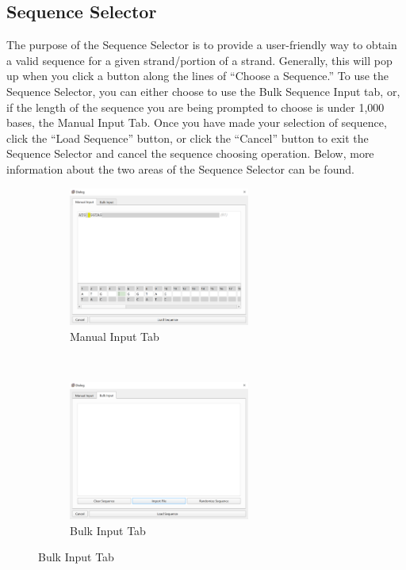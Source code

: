 \documentclass[titlepage]{article}
\begin{document}
\subsection{Sequence Selector} \label{sect:sequence-selector}
	The purpose of the Sequence Selector is to provide a user-friendly way to obtain a valid sequence for a given strand/portion of a strand. Generally, this will pop up when you click a button along the lines of ``Choose a Sequence.'' To use the Sequence Selector, you can either choose to use the Bulk Sequence Input tab, or, if the length of the sequence you are being prompted to choose is under 1,000 bases, the Manual Input Tab. Once you have made your selection of sequence, click the ``Load Sequence'' button, or click the ``Cancel'' button to exit the Sequence Selector and cancel the sequence choosing operation. Below, more information about the two areas of the Sequence Selector can be found.

\begin{figure} \label{fig:sequence-dialog-manual-input}
	\centering
	\caption{Sequence Selector Dialog}
	\begin{subfigure}{.5\textwidth}
		\centering
		\includegraphics[height=1.8in]{sequence-editor-manual-input.png}
		\caption{Manual Input Tab}
	\end{subfigure}%
	~
	\begin{subfigure}{.5\textwidth}
		\centering
		\includegraphics[height=1.8in]{sequence-editor-bulk-input.png}
		\caption{Bulk Input Tab}
		\label{fig:sequence-dialog-bulk-input}
	\end{subfigure}
\end{figure}
\end{document}
